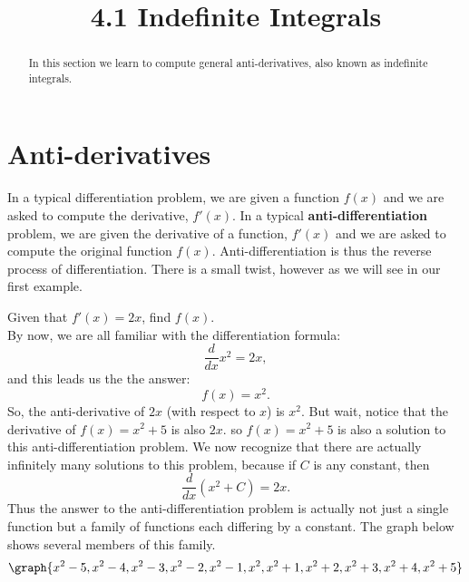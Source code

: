 \documentclass{ximera}
\title{4.1 Indefinite Integrals}
\begin{document}
\begin{abstract}
In this section we learn to compute general anti-derivatives, also known as indefinite integrals.
\end{abstract}

\maketitle

\section{Anti-derivatives}
In a typical differentiation problem, we are given a function $f(x)$ and
we are asked to compute the derivative, $f'(x)$.
In a typical \textbf{anti-differentiation} problem, we are given the derivative of a function, $f'(x)$
and we are asked to compute the original function $f(x)$.  Anti-differentiation is thus the reverse process of differentiation.
There is a small twist, however as we will see in our first example.

\begin{example}
Given that $f'(x) = 2x$, find $f(x)$. \\
By now, we are all familiar with the differentiation formula:
\[
\frac{d}{dx} x^2 = 2x,
\]
and this leads us the the answer:
\[
f(x) = x^2.
\]
So, the anti-derivative of $2x$ (with respect to $x$) is $x^2$.
But wait, notice that the derivative of $f(x) = x^2 + 5$ is also $2x$.
so $f(x) = x^2 + 5$ is also a solution to this anti-differentiation problem.
We now recognize that there are actually infinitely many solutions to this problem, 
because if $C$ is any constant, then
\[
\frac{d}{dx} \left(x^2 + C\right) = 2x.
\]
Thus the answer to the anti-differentiation problem is actually not just a single function but a family of functions each differing by a constant.
The graph below shows several members of this family.
\[
\graph{x^2 - 5, x^2 - 4, x^2 - 3, x^2 - 2, x^2 - 1, x^2, x^2 +1, x^2 +2, x^2 +3, x^2 +4, x^2 +5}
\]

\end{example}
\end{document}
